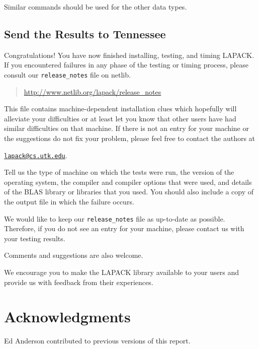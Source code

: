 \documentclass[11pt]{report}
\begin{document}
\begin{itemize}
\noindent
Similar commands should be used for the other data types.
\end{itemize}

\subsection{Send the Results to Tennessee}\label{sendresults}

Congratulations!  You have now finished installing, testing, and
timing LAPACK.  If you encountered failures in any phase of the 
testing or timing process, please
consult our \texttt{release\_notes} file on netlib.
\begin{quote}
\url{http://www.netlib.org/lapack/release\_notes}
\end{quote}
This file contains machine-dependent installation clues which hopefully will 
alleviate your difficulties or at least let you know that other users
have had similar difficulties on that machine.  If there is not an entry
for your machine or the suggestions do not fix your problem, please feel
free to contact the authors at
\begin{list}{}{}
\item \href{mailto:lapack@cs.utk.edu}{\texttt{lapack@cs.utk.edu}}.
\end{list}
Tell us the 
type of machine on which the tests were run, the version of the operating
system, the compiler and compiler options that were used,
and details of the BLAS library or libraries that you used.  You should
also include a copy of the output file in which the failure occurs.

We would like to keep our \texttt{release\_notes} file as up-to-date as possible.
Therefore, if you do not see an entry for your machine, please contact us
with your testing results.

Comments and suggestions are also welcome.

We encourage you to make the LAPACK library available to your
users and provide us with feedback from their experiences.

\section*{Acknowledgments}

Ed Anderson contributed to previous versions of this report.

\appendix
\end{document}
